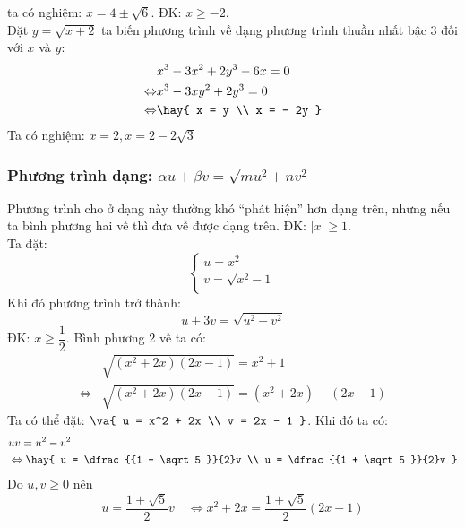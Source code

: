 ta có nghiệm: $x = 4 \pm \sqrt 6 $.
\hda
ĐK: $x\ge -2$.\\
Đặt $y = \sqrt {x + 2} $ ta biến phương trình về dạng phương trình thuần nhất bậc 3 đối với $x$ và $y$:
\begin{align*}
& x^3 - 3x^2 + 2y^3 - 6x = 0 \\ \Leftrightarrow & x^3 - 3xy^2 + 2y^3 = 0\\
 \Leftrightarrow  & \hay{
 x = y \\ 
 x = - 2y }
 \end{align*}
Ta có nghiệm: $x = 2, x = 2 - 2\sqrt 3 $
\subsubsection{Phương trình dạng:  $\alpha u + \beta v = \sqrt {mu^2 + nv^2 } $}
Phương trình cho ở dạng này thường khó “phát hiện” hơn dạng trên, nhưng nếu ta bình phương hai vế thì đưa về được dạng trên.
\hda
ĐK: $|x| \geq 1$.\\
Ta đặt: $$\left\{ \begin{array}{l}
 u = x^2 \\ 
 v = \sqrt {x^2 - 1} \\ 
 \end{array} \right.$$
Khi đó phương trình trở thành:  $$u + 3v = \sqrt {u^2 - v^2 } $$
\hda
ĐK: $x \ge \dfrac{1}{2}$. Bình phương 2 vế ta có:  
\begin{align*}
& \sqrt {\left( {x^2 + 2x} \right)\left( {2x - 1} \right)} = x^2 + 1 \\ \Leftrightarrow & \sqrt {\left( {x^2 + 2x} \right)\left( {2x - 1} \right)} = \left( {x^2 + 2x} \right) - \left( {2x - 1} \right)
\end{align*}
Ta có thể đặt: $\va{
 u = x^2 + 2x \\ 
 v = 2x - 1 }$. Khi đó ta có:
\begin{align*}
& uv = u^2 - v^2 \\
& \Leftrightarrow \hay{
 u = \dfrac{{1 - \sqrt 5 }}{2}v \\ 
 u = \dfrac{{1 + \sqrt 5 }}{2}v }
\end{align*}
Do $u,v \ge 0$ nên 
$$u = \dfrac{{1 + \sqrt 5 }}{2}v \quad \Leftrightarrow x^2 + 2x = \dfrac{{1 + \sqrt 5 }}{2}\left( {2x - 1} \right)$$
